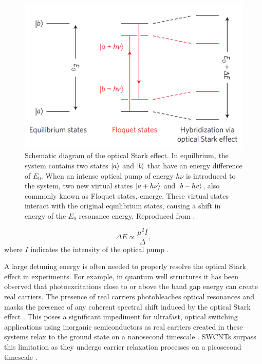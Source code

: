 \begin{figure}[ht]
	\centering
	\includegraphics[scale=0.3]{images/chapter_prior_works/optical_stark_effect_sie_2014}
	\caption{Schematic diagram of the optical Stark effect. In equilbrium, the system contains two states $\ket{a}$ and $\ket{b}$ that have an energy difference of $E_0$. When an intense optical pump of energy $h \nu$ is introduced to the system, two new virtual states $\ket{a + h \nu }$ and $\ket{b - hv}$, also commonly known as Floquet states, emerge. These virtual states interact with the original equilibrium states, causing a shift in energy of the $E_0$ resonance energy. Reproduced from \cite{sie2015valley}.}
	\label{fig:optical_stark_effect_schematic_sie}
\end{figure}


\begin{equation}
		\Delta E \propto \frac{\mu^2 I}{\Delta},
		\label{eq:ose_blueshift}
\end{equation}
where $I$ indicates the intensity of the optical pump \cite{combescot1992semiconductors}.

A large detuning energy is often needed to properly resolve the optical Stark effect in experiments. For example, in quantum well structures it has been observed that photoexcitations close to or above the band gap energy can create real carriers. The presence of real carriers photobleaches optical resonances and masks the presence of any coherent spectral shift induced by the optical Stark effect \cite{peyghambarian1984blue}. This poses a significant impediment for ultrafast, optical switching applications using inorganic semiconductors as real carriers created in these systems relax to the ground state on a nanosecond timescale \cite{maeda2006gigantic}. SWCNTs surpass this limitation as they undergo carrier relaxation processes on a picosecond timescale \cite{ostojic2004interband, wang2004observation, manzoni2005intersubband, maeda2006gigantic}.

